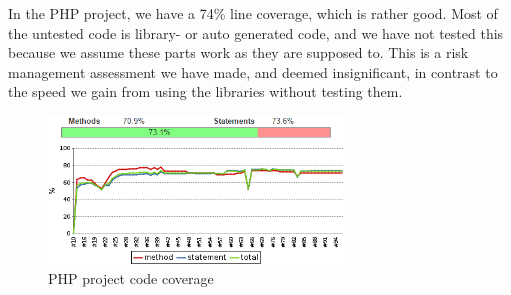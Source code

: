 \noindent
In the PHP project, we have a 74\% line coverage, which is rather good. Most of the untested code is library- or auto generated code, and we have not tested this because we assume these parts work as they are supposed to. This is a risk management assessment we have made, and deemed insignificant, in contrast to the speed we gain from using the libraries without testing them. %

\begin{figure}[!htbp]
    \centering
    \includegraphics[width=0.7\textwidth]{graphic/quality_assurance/jenkins_php_code_coverage}
    \caption{PHP project code coverage}
    \label{fig:php_project_code_coverage}
\end{figure}
\FloatBarrier

